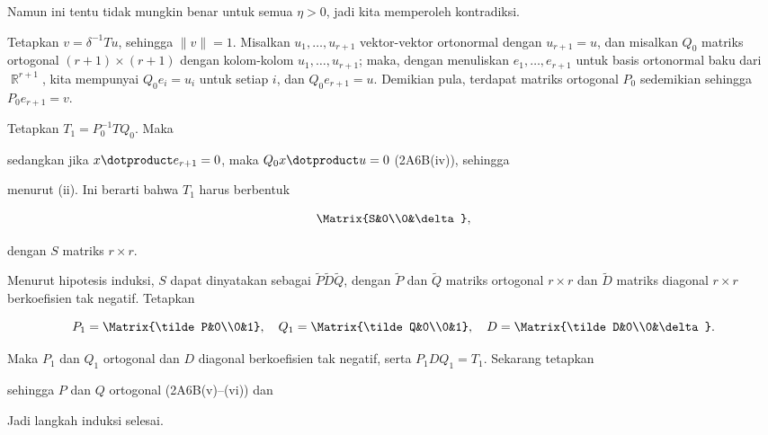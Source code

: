 {\noindent Namun ini tentu tidak mungkin benar untuk semua $\eta>0$, jadi
kita memperoleh kontradiksi.\ \Bang\Qed

\medskip

 Tetapkan $v=\delta^{-1}Tu$, sehingga $\|v\|=1$. Misalkan
$u_1,\ldots,u_{r+1}$ vektor-vektor ortonormal dengan $u_{r+1}=u$, dan
misalkan $Q_0$ matriks ortogonal $(r+1)\times(r+1)$ dengan kolom-kolom
$u_1,\ldots,u_{r+1}$; maka, dengan menuliskan $e_1,\ldots,e_{r+1}$ untuk
basis ortonormal baku dari $\BbbR^{r+1}$, kita mempunyai $Q_0e_i=u_i$ untuk
setiap $i$, dan $Q_0e_{r+1}=u$. Demikian pula, terdapat matriks ortogonal
$P_0$ sedemikian sehingga $P_0e_{r+1}=v$.

Tetapkan $T_1=P_0^{-1}TQ_0$. Maka


\noindent sedangkan jika $x\dotproduct e_{r+1}=0$, maka
$Q_0x\dotproduct u=0$ (2A6B(iv)), sehingga


\noindent menurut (ii). Ini berarti bahwa $T_1$ harus berbentuk

$$\Matrix{S&0\\0&\delta},$$

\noindent dengan $S$ matriks $r\times r$.

\medskip

 Menurut hipotesis induksi, $S$ dapat dinyatakan sebagai
$\tilde P\tilde D\tilde Q$, dengan $\tilde P$ dan $\tilde Q$ matriks
ortogonal $r\times r$ dan $\tilde D$ matriks diagonal $r\times r$
berkoefisien tak negatif. Tetapkan

$$P_1=\Matrix{\tilde P&0\\0&1},\quad Q_1=\Matrix{\tilde Q&0\\0&1},\quad
D=\Matrix{\tilde D&0\\0&\delta}.$$

\noindent Maka $P_1$ dan $Q_1$ ortogonal dan $D$ diagonal berkoefisien tak
negatif, serta $P_1DQ_1=T_1$. Sekarang tetapkan

\noindent sehingga $P$ dan $Q$ ortogonal (2A6B(v)--(vi)) dan


\noindent Jadi langkah induksi selesai.
}%

\frnewpage

